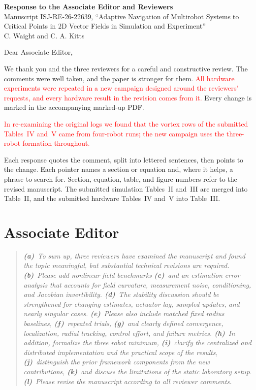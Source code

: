 \documentclass[10pt]{article}
\newcommand{\syn}[1]{\textcolor{red}{#1}}            %
\begin{document}
\begin{center}
{\large\bfseries Response to the Associate Editor and Reviewers}\\[3pt]
Manuscript ISJ-RE-26-22639, ``Adaptive Navigation of Multirobot Systems to Critical Points in 2D Vector Fields in Simulation and Experiment''\\[2pt]
C. Waight and C. A. Kitts
\end{center}

Dear Associate Editor,

We thank you and the three reviewers for a careful and constructive review. The comments were well taken, and the paper is stronger for them. \syn{All hardware experiments were repeated in a new campaign designed around the reviewers' requests, and every hardware result in the revision comes from it.} Every change is marked in the accompanying marked-up PDF.

\syn{In re-examining the original logs we found that the vortex rows of the submitted Tables~IV and~V came from four-robot runs; the new campaign uses the three-robot formation throughout.}

Each response quotes the comment, split into lettered sentences, then points to the change. Each pointer names a section or equation and, where it helps, a phrase to search for. Section, equation, table, and figure numbers refer to the revised manuscript. The submitted simulation Tables~II and~III are merged into Table~II, and the submitted hardware Tables~IV and~V into Table~III.

\section*{Associate Editor}

\begin{quote}\itshape
\textbf{(a)}~To sum up, three reviewers have examined the manuscript and found the topic meaningful, but substantial technical revisions are required.
\textbf{(b)}~Please add nonlinear field benchmarks
\textbf{(c)}~and an estimation error analysis that accounts for field curvature, measurement noise, conditioning, and Jacobian invertibility.
\textbf{(d)}~The stability discussion should be strengthened for changing estimates, actuator lag, sampled updates, and nearly singular cases.
\textbf{(e)}~Please also include matched fixed radius baselines,
\textbf{(f)}~repeated trials,
\textbf{(g)}~and clearly defined convergence, localization, radial tracking, control effort, and failure metrics.
\textbf{(h)}~In addition, formalize the three robot minimum,
\textbf{(i)}~clarify the centralized and distributed implementation and the practical scope of the results,
\textbf{(j)}~distinguish the prior framework components from the new contributions,
\textbf{(k)}~and discuss the limitations of the static laboratory setup.
\textbf{(l)}~Please revise the manuscript according to all reviewer comments.
\end{quote}
\end{document}
